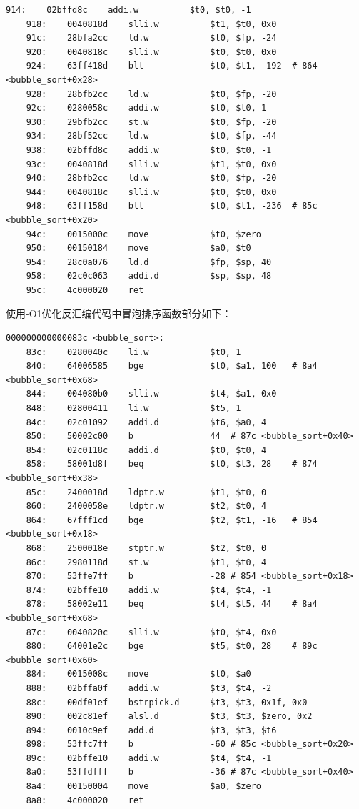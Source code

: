 \documentclass[UTF8]{report}
\begin{document}
\begin{lstlisting}[language=LoongArch]
    914:	02bffd8c 	addi.w      	$t0, $t0, -1
    918:	0040818d 	slli.w      	$t1, $t0, 0x0
    91c:	28bfa2cc 	ld.w        	$t0, $fp, -24
    920:	0040818c 	slli.w      	$t0, $t0, 0x0
    924:	63ff418d 	blt         	$t0, $t1, -192	# 864 <bubble_sort+0x28>
    928:	28bfb2cc 	ld.w        	$t0, $fp, -20
    92c:	0280058c 	addi.w      	$t0, $t0, 1
    930:	29bfb2cc 	st.w        	$t0, $fp, -20
    934:	28bf52cc 	ld.w        	$t0, $fp, -44
    938:	02bffd8c 	addi.w      	$t0, $t0, -1
    93c:	0040818d 	slli.w      	$t1, $t0, 0x0
    940:	28bfb2cc 	ld.w        	$t0, $fp, -20
    944:	0040818c 	slli.w      	$t0, $t0, 0x0
    948:	63ff158d 	blt         	$t0, $t1, -236	# 85c <bubble_sort+0x20>
    94c:	0015000c 	move        	$t0, $zero
    950:	00150184 	move        	$a0, $t0
    954:	28c0a076 	ld.d        	$fp, $sp, 40
    958:	02c0c063 	addi.d      	$sp, $sp, 48
    95c:	4c000020 	ret         
  \end{lstlisting}
  
  使用-O1优化反汇编代码中冒泡排序函数部分如下：

  \begin{lstlisting}[language=LoongArch]
    000000000000083c <bubble_sort>:
    83c:	0280040c 	li.w        	$t0, 1
    840:	64006585 	bge         	$t0, $a1, 100	# 8a4 <bubble_sort+0x68>
    844:	004080b0 	slli.w      	$t4, $a1, 0x0
    848:	02800411 	li.w        	$t5, 1
    84c:	02c01092 	addi.d      	$t6, $a0, 4
    850:	50002c00 	b           	44	# 87c <bubble_sort+0x40>
    854:	02c0118c 	addi.d      	$t0, $t0, 4
    858:	58001d8f 	beq         	$t0, $t3, 28	# 874 <bubble_sort+0x38>
    85c:	2400018d 	ldptr.w     	$t1, $t0, 0
    860:	2400058e 	ldptr.w     	$t2, $t0, 4
    864:	67fff1cd 	bge         	$t2, $t1, -16	# 854 <bubble_sort+0x18>
    868:	2500018e 	stptr.w     	$t2, $t0, 0
    86c:	2980118d 	st.w        	$t1, $t0, 4
    870:	53ffe7ff 	b           	-28	# 854 <bubble_sort+0x18>
    874:	02bffe10 	addi.w      	$t4, $t4, -1
    878:	58002e11 	beq         	$t4, $t5, 44	# 8a4 <bubble_sort+0x68>
    87c:	0040820c 	slli.w      	$t0, $t4, 0x0
    880:	64001e2c 	bge         	$t5, $t0, 28	# 89c <bubble_sort+0x60>
    884:	0015008c 	move        	$t0, $a0
    888:	02bffa0f 	addi.w      	$t3, $t4, -2
    88c:	00df01ef 	bstrpick.d  	$t3, $t3, 0x1f, 0x0
    890:	002c81ef 	alsl.d      	$t3, $t3, $zero, 0x2
    894:	0010c9ef 	add.d       	$t3, $t3, $t6
    898:	53ffc7ff 	b           	-60	# 85c <bubble_sort+0x20>
    89c:	02bffe10 	addi.w      	$t4, $t4, -1
    8a0:	53ffdfff 	b           	-36	# 87c <bubble_sort+0x40>
    8a4:	00150004 	move        	$a0, $zero
    8a8:	4c000020 	ret         
  \end{lstlisting}
\end{document}

